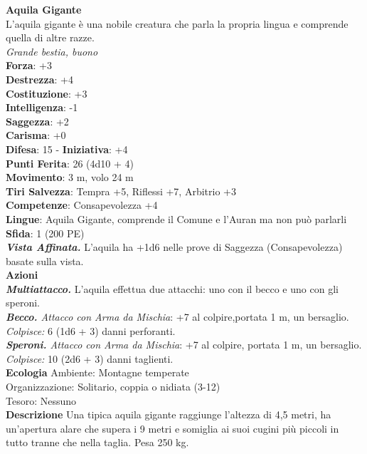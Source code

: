 \begin{multicols}{2}
\medskip\textbf{Aquila Gigante}\\
L'aquila gigante è una nobile creatura che parla la propria lingua e comprende quella di altre razze.\\
\emph{Grande bestia, buono}\\
\textbf{Forza}: +3\\
\textbf{Destrezza}: +4\\
\textbf{Costituzione}: +3\\
\textbf{Intelligenza}: -1\\
\textbf{Saggezza}: +2\\
\textbf{Carisma}: +0\\
\textbf{Difesa}: 15 - \textbf{Iniziativa}: +4\\
\textbf{Punti Ferita}: 26 (4d10 + 4)\\
\textbf{Movimento}: 3 m, volo 24 m\\
\textbf{Tiri Salvezza}: Tempra +5, Riflessi +7, Arbitrio +3\\
\textbf{Competenze}: Consapevolezza +4\\
\textbf{Lingue}: Aquila Gigante, comprende il Comune e l'Auran ma non può parlarli\\
\textbf{Sfida}: 1 (200 PE)\smallskip\\
\emph{\textbf{Vista Affinata.}} L'aquila ha +1d6 nelle prove di Saggezza (Consapevolezza) basate sulla vista.\\
\smallskip\textbf{Azioni}\\
\emph{\textbf{Multiattacco.}} L'aquila effettua due attacchi: uno con il becco e uno con gli speroni.\\
\emph{\textbf{Becco.} Attacco con Arma da Mischia}: +7 al colpire,portata 1 m, un bersaglio.\\
\emph{Colpisce:} 6 (1d6 + 3) danni perforanti.\\
\emph{\textbf{Speroni.} Attacco con Arma da Mischia}: +7 al colpire, portata 1 m, un bersaglio.\\
\emph{Colpisce:} 10 (2d6 + 3) danni taglienti.\\
\textbf{Ecologia}
Ambiente: Montagne temperate\\
Organizzazione: Solitario, coppia o nidiata (3-12)\\
Tesoro: Nessuno\\
\textbf{Descrizione}
Una tipica aquila gigante raggiunge l'altezza di 4,5 metri, ha un’apertura alare che supera i 9 metri e somiglia ai suoi cugini più piccoli in tutto tranne che nella taglia. Pesa 250 kg.\\


\end{multicols}
